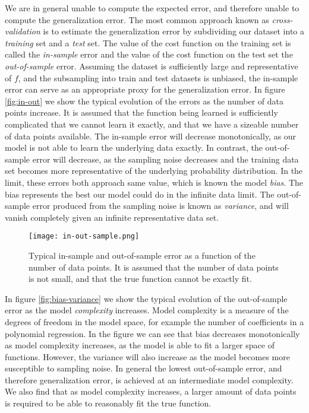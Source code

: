 We are in general unable to compute the expected error, and therefore unable
to compute the generalization error. The most common approach known as
\textit{cross-validation} is to estimate the
generalization error by subdividing our dataset into a \textit{training} set
and a \textit{test} set. The value of the cost function on the training set
is called the \textit{in-sample} error and the value of the cost
function on the test set the \textit{out-of-sample} error.
Assuming the dataset is sufficiently large and representative of $f$, and the subsampling
into train and test datasets is unbiased, the in-sample error
can serve as an appropriate proxy for the generalization error.
\newline
In figure \ref{fig:in-out}
we show the typical evolution of the errors as the number of data points increase.
It is assumed that the function being learned is sufficiently complicated
that we cannot learn it exactly, and that we have a sizeable number of data points
available. The in-sample error will decrease monotonically, as our model
is not able to learn the underlying data exactly. In contrast, the out-of-sample
error will decrease, as the sampling noise decreases and the training
data set becomes more representative of the underlying probability distribution.
In the limit, these errors both approach same value, which is known the model
\textit{bias}. The bias represents the best our model could do in the infinite data limit.
The out-of-sample error produced from the sampling noise
is known as \textit{variance}, and will vanish completely
given an infinite representative data set.

\begin{figure}
    \texttt{[image: in-out-sample.png]}
    \caption{Typical in-sample and out-of-sample error as a function
    of the number of data points. It is assumed that the number
    of data points is not small, and that the true function
    cannot be exactly fit.}
\end{figure}

In figure \ref{fig:bias-variance} we show the typical evolution
of the out-of-sample error as the model \textit{complexity} increases.
Model complexity is a measure of the degrees of freedom in the model space,
for example the number of coefficients in a polynomial regression.
In the figure we can see that bias decreases monotonically as model complexity
increases, as the model is able to fit a larger space of functions.
However, the variance will also increase as the model becomes more
susceptible to sampling noise. In general the lowest out-of-sample error,
and therefore generalization error, is achieved at an intermediate
model complexity. We also find that as model complexity increases,
a larger amount of data points is required to be able to reasonably
fit the true function.


